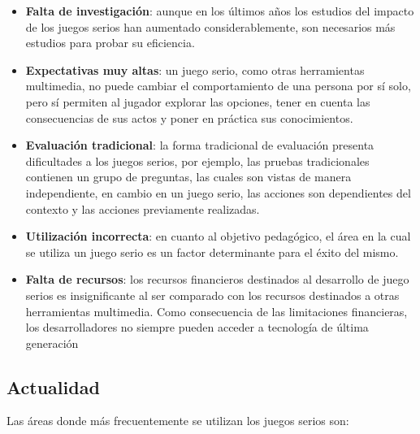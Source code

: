 \begin{itemize}

\item \textbf{Falta de investigación}: aunque en los últimos años los estudios
    del impacto de los juegos serios han aumentado considerablemente, son
    necesarios más estudios para probar su eficiencia\cite{sg:aoverview}.

\item \textbf{Expectativas muy altas}: un juego serio, como otras herramientas
    multimedia, no puede cambiar el comportamiento de una persona por sí solo,
    pero sí permiten al jugador explorar las opciones, tener en cuenta las
    consecuencias de sus actos y poner en práctica sus
    conocimientos\cite{education:games,stapleton2004serious,videojuegos:gonzaleztardon}. 

\item \textbf{Evaluación tradicional}: la forma tradicional de evaluación presenta
    dificultades a los juegos serios, por ejemplo, las pruebas tradicionales
    contienen un grupo de preguntas, las cuales son vistas de manera
    independiente, en cambio en un juego serio, las acciones son dependientes
    del contexto y las acciones previamente realizadas\cite{shute2009melding}.

\item \textbf{Utilización incorrecta}: en cuanto al objetivo pedagógico, el área
    en la cual se utiliza un juego serio es un factor determinante para el éxito
    del mismo\cite{stapleton2004serious}.

\item \textbf{Falta de recursos}: los recursos financieros destinados al
    desarrollo de juego serios es insignificante al ser comparado con los
    recursos destinados a otras herramientas
    multimedia\cite{stapleton2004serious,sg:aoverview}. Como consecuencia de las
    limitaciones financieras, los desarrolladores no siempre pueden acceder a
    tecnología de última generación\cite{stapleton2004serious}

\end{itemize}

\subsection{Actualidad}

Las áreas donde más frecuentemente se utilizan los juegos serios son:

